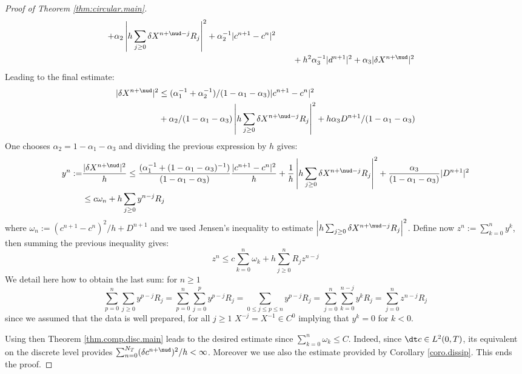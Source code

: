 \documentclass[]{jnsao}
\renewcommand{\tr}{R}
\begin{document}
\begin{proof}[Proof of Theorem \ref{thm:circular.main}]
$$\begin{aligned}
 		+ \alpha_2 \left|h \sum_{j\geq 0} \delta {X}^{n+\nud-j} \tr_j\right|^2  + \alpha_2^{-1} |c^{n+1}-c^n|^2 \\
 		& \qquad+ h^2  \alpha_3^{-1} |d^{n+1}|^2 +  \alpha_3 |\delta X^{n+\nud}|^2
 	\end{aligned}
 	$$
 	Leading to the final estimate:
 	$$
 	\begin{aligned}			
 		|\delta X^{n+\nud}|^2 &\leq 
 		(\alpha_1^{-1} + \alpha_2^{-1}) /(1 - \alpha_1 - \alpha_3)  |c^{n+1}-c^n|^2 \\
 		& + \alpha_2/(1 - \alpha_1 - \alpha_3)  \left|h \sum_{j\geq 0} \delta {X}^{n+\nud-j} \tr_j\right|^2 + h	 \alpha_3 D^{n+1} 	/(1 - \alpha_1 - \alpha_3	) 		
 	\end{aligned}
 	$$
 	One chooses $\alpha_2=1-\alpha_1 - \alpha_3$ and dividing the previous expression by $h$ gives:
 	$$
 	\begin{aligned}			
 		y^n:= & \frac{|\delta X^{n+\nud}|^2}{h} \leq 
 		\frac{(\alpha_1^{-1} + (1-\alpha_1 - \alpha_3)^{-1})}{(1 - \alpha_1 - \alpha_3)}  \frac{|c^{n+1}-c^n|^2}{h}  
		+ \frac{1}{h} \left|h \sum_{j\geq 0} \delta {X}^{n+\nud-j} \tr_j\right|^2 + 	 \frac{\alpha_3}{(1 - \alpha_1 - \alpha_3	)} |D^{n+1}|^2	\\
 		& \leq c \omega_n  + h \sum_{j\geq 0} y^{n-j} \tr_j 	
 	\end{aligned}
 	$$
 	where $\omega_n:= (c^{n+1}-c^n)^2/h + D^{n+1} $ and we used Jensen's inequality to 
 	estimate $\left|h \sum_{j\geq 0} \delta {X}^{n+\nud-j} \tr_j\right|^2$.
 	Define now $z^n:= \sum_{k=0}^{n} y^k$, then summing the previous inequality gives:
 	$$
 	z^n \leq c \sum_{k=0}^n \omega_k + h \sum_{j\geq 0}^{n} \tr_j z^{n-j}
 	$$
 	We detail here how to obtain the last sum: for $n \geq 1$ 
 	$$
 		\sum_{p= 0}^{n}\sum_{j\geq 0} y^{p-j} \tr_j 
		= \sum_{p=0}^{n} \sum_{j=0}^p y^{p-j} \tr_j = \sum_{0\leq j \leq p \leq n} y^{p-j} \tr_j 
		= \sum_{j= 0}^{n} \sum_{k=0}^{n-j} y^{k} \tr_j 
 		= \sum_{j=0}^{n} z^{n-j} \tr_j
 	$$
 	since we assumed that the data is well prepared, for all $j \geq 1$ $X^{-j} = X^{-1}\in C^0$ implying that $y^k = 0$ for $k < 0$.

	
 	Using then Theorem \ref{thm.comp.disc.main}  leads to the desired estimate since 
 	$\sum_{k=0}^n \omega_k \leq C$. Indeed, 
	since $\dt c \in L^2 (0,T)$, its equivalent 
 	on the discrete level provides $\sum_{n=0}^{N_T} (\delta c^{n+ \nud})^2/h < \infty$. Moreover we use also 
 	the estimate provided by Corollary \ref{coro.dissip}. This ends the proof.	
 \end{proof}
 
\end{document}
